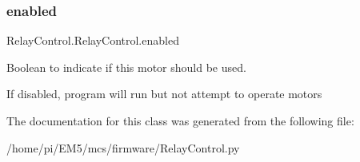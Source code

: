 \subsubsection{\texorpdfstring{enabled}{enabled}}
{\footnotesize\ttfamily Relay\+Control.\+Relay\+Control.\+enabled}



Boolean to indicate if this motor should be used. 

If disabled, program will run but not attempt to operate motors 

The documentation for this class was generated from the following file\+:\begin{DoxyCompactItemize}
\item 
/home/pi/\+E\+M5/mcs/firmware/Relay\+Control.\+py\end{DoxyCompactItemize}
